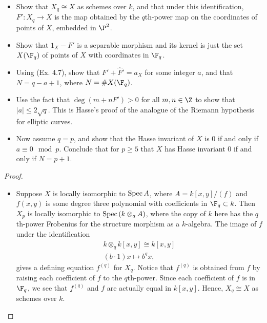 \documentclass[a4paper]{article}
\begin{document}
\begin{enumerate} [label=\textbf{\arabic*.}, leftmargin=0em]
          \begin{itemize}
              \item[(a)] Show that $X_q \cong X$ as schemes over $k$, and that under this identification, $F' : X_q \to X$ is the map obtained by the $q$th-power map on the coordinates of points of $X$, embedded in $\P^2$.
              \item[(b)] Show that $1_X - F'$ is a separable morphism and its kernel is just the set $X(\F_q)$ of points of $X$ with coordinates in $\F_{q}$.
              \item[(c)] Using (Ex. 4.7), show that $F' + \hat{F}' = a_X$ for some integer $a$, and that $N = q - a + 1$, where $N = \# X(\F_q)$.
              \item[(d)] Use the fact that $\deg(m + nF') > 0$ for all $m, n \in \Z$ to show that $|a| \leq 2\sqrt{q}$.
                    This is Hasse's proof of the analogue of the Riemann hypothesis for elliptic curves.
              \item[(e)] Now assume $q = p$, and show that the Hasse invariant of $X$ is 0 if and only if $a \equiv 0 \mod{p}$.
                    Conclude that for $p \geq 5$ that $X$ has Hasse invariant 0 if and only if $N = p + 1$.
          \end{itemize}

          \begin{proof} $ $ \vspace{0pt}
              \begin{itemize} [leftmargin=0cm]
                  \item[(a)] Suppose $X$ is locally isomorphic to $\operatorname{Spec}{A}$, where $A = k[x, y]/ (f)$ and $f(x, y)$ is some degree three polynomial with coefficients in $\F_q \subset k$.
                        Then $X_p$ is locally isomorphic to $\operatorname{Spec}{(k \otimes_q A)}$, where the copy of $k$ here has the $q$th-power Frobenius for the structure morphism as a $k$-algebra.
                        The image of $f$ under the identification
                        \begin{align*}
                            k \otimes_q k[x, y] \cong k[x, y] \\
                            (b \cdot 1) x \mapsto b^qx,
                        \end{align*}
                        gives a defining equation $f^{(q)}$ for $X_q$.
                        Notice that $f^{(q)}$ is obtained from $f$ by raising each coefficient of $f$ to the $q$th-power.
                        Since each coefficient of $f$ is in $\F_q$, we see that $f^{(q)}$ and $f$ are actually equal in $k[x, y]$.
                        Hence, $X_q \cong X$ as schemes over $k$.


\end{itemize}
\end{proof}
\end{enumerate}
\end{document}
